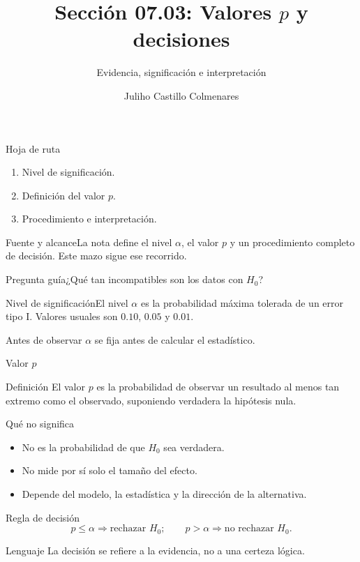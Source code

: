 \documentclass[10pt,aspectratio=169]{beamer}
\title[Valores $p$ y decisiones]{Sección 07.03: Valores $p$ y decisiones}\subtitle{Evidencia, significación e interpretación}
\author[J. Castillo Colmenares]{Juliho Castillo Colmenares}\institute{Tecnológico de Monterrey}\date{}
\begin{document}
\begin{frame}[plain]\titlepage\end{frame}
\begin{frame}{Hoja de ruta}\small\begin{enumerate}\item Nivel de significación.\item Definición del valor $p$.\item Procedimiento e interpretación.\end{enumerate}\end{frame}
\begin{frame}{Fuente y alcance}\small La nota define el nivel $\alpha$, el valor $p$ y un procedimiento completo de decisión. Este mazo sigue ese recorrido.\begin{block}{Pregunta guía}¿Qué tan incompatibles son los datos con $H_0$?\end{block}\end{frame}
\begin{frame}{Nivel de significación}\small El nivel $\alpha$ es la probabilidad máxima tolerada de un error tipo I. Valores usuales son $0.10$, $0.05$ y $0.01$.\begin{alertblock}{Antes de observar} $\alpha$ se fija antes de calcular el estadístico.\end{alertblock}\end{frame}
\begin{frame}{Valor $p$}\small\begin{block}{Definición} El valor $p$ es la probabilidad de observar un resultado al menos tan extremo como el observado, suponiendo verdadera la hipótesis nula.\end{block}\end{frame}
\begin{frame}{Qué no significa}\small\begin{itemize}\item No es la probabilidad de que $H_0$ sea verdadera.\item No mide por sí solo el tamaño del efecto.\item Depende del modelo, la estadística y la dirección de la alternativa.\end{itemize}\end{frame}
\begin{frame}{Regla de decisión}\small\[p\leq\alpha\Rightarrow\text{rechazar }H_0;\qquad p>\alpha\Rightarrow\text{no rechazar }H_0.\]\begin{block}{Lenguaje} La decisión se refiere a la evidencia, no a una certeza lógica.\end{block}\end{frame}
\end{document}
